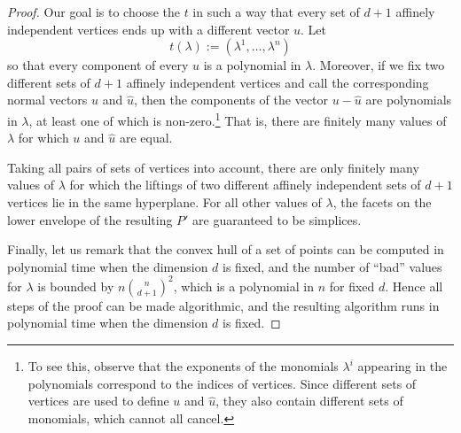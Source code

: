 \begin{proof}
  Our goal is to choose the $t$ in such a way that every set of $d+1$ affinely independent vertices ends up with a different vector $u$.
  Let
  \[
    t(\lambda) := (\lambda^1, \ldots, \lambda^n)
  \]
  so that every component of every $u$ is a polynomial in $\lambda$.
  Moreover, if we fix two different sets of $d+1$ affinely independent vertices
  and call the corresponding normal vectors $u$ and $\hat u$,
  then the components of the vector $u - \hat u$ are polynomials in $\lambda$,
  at least one of which is non-zero.\footnote{To see this,
  observe that the exponents of the monomials $\lambda^i$ appearing in the polynomials correspond to the indices of vertices.
  Since different sets of vertices are used to define $u$ and $\hat u$,
  they also contain different sets of monomials, which cannot all cancel.}
  That is, there are finitely many values of $\lambda$ for which $u$ and $\hat u$ are equal.

  Taking all pairs of sets of vertices into account,
  there are only finitely many values of $\lambda$
  for which the liftings of two different affinely independent sets of $d+1$ vertices lie in the same hyperplane.
  For all other values of $\lambda$, the facets on the lower envelope of the resulting $P'$ are guaranteed to be simplices.

  Finally, let us remark that the convex hull of a set of points can be computed in polynomial time when the dimension $d$ is fixed,
  and the number of ``bad'' values for $\lambda$ is bounded by $n \binom{n}{d+1}^2$, which is a polynomial in $n$ for fixed $d$.
  Hence all steps of the proof can be made algorithmic, and the resulting algorithm runs in polynomial time
  when the dimension $d$ is fixed.
\end{proof}

